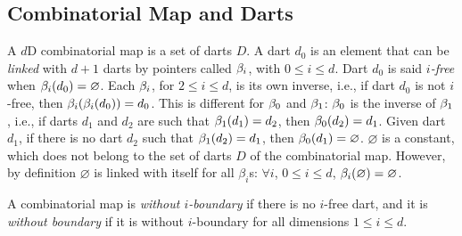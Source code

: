 \subsection{Combinatorial Map and Darts}\label{ssec-combi-map-and-darts}
A $d$D combinatorial map is a set of darts $D$. A dart $d_0$ is an
element that can be \emph{linked} with $d+1$ darts by pointers called
$\beta_{i}$, with $0 \leq i \leq d$.  Dart $d_0$ is said \emph{$i$-free}
when $\beta_{i}(d_0)=\varnothing$.  Each $\beta_{i}$, for $2 \leq i \leq d$,
is its own inverse, i.e., if dart $d_0$ is not $i$-free, then
$\beta_{i}(\beta_{i}(d_0))=d_0$.  This is different for $\beta_{0}$ and
$\beta_{1}$: $\beta_{0}$ is the inverse of $\beta_{1}$, i.e., if darts $d_1$
and $d_2$ are such that $\beta_{1}(d_1)=d_2$, then
$\beta_{0}(d_2)=d_1$. Given dart $d_1$, if there is no dart $d_2$ such
that $\beta_{1}(d_2)=d_1$, then $\beta_{0}(d_1)=\varnothing$.  $\varnothing$
is a constant, which does not belong to the set of darts $D$ of the
combinatorial map. However, by definition $\varnothing$ is linked with
itself for all $\beta_i$s: $\forall i$, $0 \leq i \leq d$,
$\beta_{i}(\varnothing)=\varnothing$.




A combinatorial map is \emph{without $i$-boundary} if there is no
$i$-free dart, and it is \emph{without boundary} if it is without
$i$-boundary for all dimensions $1 \leq i \leq d$.


